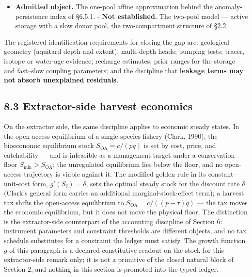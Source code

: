 \documentclass[11pt]{article}
\begin{document}
\begin{itemize}\setlength{\itemsep}{2pt}
\item \textbf{Admitted object.} The one-pool affine approximation behind the anomaly-persistence index of \S6.5.1. - \textbf{Not established.} The two-pool model --- active storage with a slow donor pool, the two-compartment structure of \S2.2.
\end{itemize}

The registered identification requirements for closing the gap are: geological geometry (aquitard depth and extent); multi-depth heads; pumping tests; tracer, isotope or water-age evidence; recharge estimates; prior ranges for the storage and fast--slow coupling parameters; and the discipline that \textbf{leakage terms may not absorb unexplained residuals}.

\subsection*{8.3 Extractor-side harvest economics}\label{83-extractor-side-harvest-economics}

On the extractor side, the same discipline applies to economic steady states. In the open-access equilibrium of a single-species fishery (Clark, 1990), the bioeconomic equilibrium stock \(S_{\mathrm{OA}} = c/(pq)\) is set by cost, price, and catchability --- and is infeasible as a management target under a conservation floor \(S_{\min} > S_{\mathrm{OA}}\): the unregulated equilibrium lies below the floor, and no open-access trajectory is viable against it. The modified golden rule in its constant-unit-cost form, \(g'(S_\delta) = \delta\), sets the optimal steady stock for the discount rate \(\delta\) (Clark's general form carries an additional marginal-stock-effect term); a harvest tax shifts the open-access equilibrium to \(S_{\mathrm{OA}} =\allowbreak{} c/((p - \tau)q)\) --- the tax moves the economic equilibrium, but it does not move the physical floor. The distinction is the extractor-side counterpart of the accounting discipline of Section 6: instrument parameters and constraint thresholds are different objects, and no tax schedule substitutes for a constraint the ledger must satisfy. The growth function \(g\) of this paragraph is a declared constitutive readout on the stock for this extractor-side remark only; it is not a primitive of the closed natural block of Section 2, and nothing in this section is promoted into the typed ledger.

\vspace{0.8em}
\end{document}
